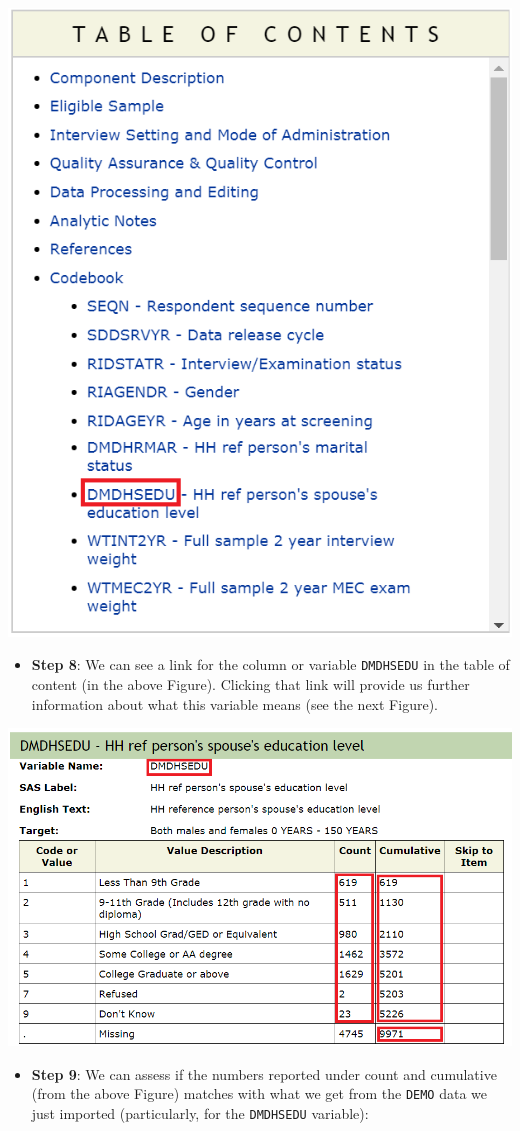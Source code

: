 \documentclass[
]{book}
\providecommand{\tightlist}{%
  \setlength{\itemsep}{0pt}\setlength{\parskip}{0pt}}
\begin{document}
\includegraphics[width=0.65\linewidth]{images/toc}

\begin{itemize}
\tightlist
\item
  \textbf{Step 8}: We can see a link for the column or variable \texttt{DMDHSEDU} in the table of content (in the above Figure). Clicking that link will provide us further information about what this variable means (see the next Figure).
\end{itemize}

\includegraphics[width=0.65\linewidth]{images/DMDHSEDU}

\begin{itemize}
\tightlist
\item
  \textbf{Step 9}: We can assess if the numbers reported under count and cumulative (from the above Figure) matches with what we get from the \texttt{DEMO} data we just imported (particularly, for the \texttt{DMDHSEDU} variable):
\end{itemize}
\end{document}
